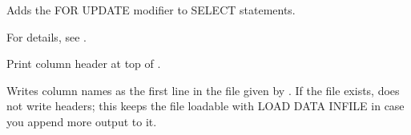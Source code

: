 \documentclass[letterpaper,10pt,english]{sphinxmanual}
\begin{document}

\begin{fulllineitems}
\label{\detokenize{mariadb-archiver:cmdoption-mariadb-archiver-for-update}}
\sphinxAtStartPar
Adds the FOR UPDATE modifier to SELECT statements.

\sphinxAtStartPar
For details, see .

\end{fulllineitems}


\begin{fulllineitems}
\label{\detokenize{mariadb-archiver:cmdoption-mariadb-archiver-header}}
\sphinxAtStartPar
Print column header at top of {\hyperref[\detokenize{mariadb-archiver:cmdoption-mariadb-archiver-file}]{}}.

\sphinxAtStartPar
Writes column names as the first line in the file given by {\hyperref[\detokenize{mariadb-archiver:cmdoption-mariadb-archiver-file}]{}}.  If the
file exists, does not write headers; this keeps the file loadable with LOAD
DATA INFILE in case you append more output to it.

\end{fulllineitems}
\end{document}
